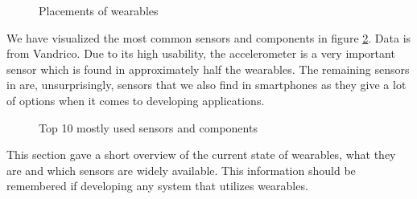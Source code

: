 \begin{figure}[!htb]
    \centering
    
    \caption{Placements of wearables}
    \label{fig:wearables-placement}
\end{figure}

We have visualized the most common sensors and components in figure \ref{fig:wearables-sensors}. Data is from Vandrico.
Due to its high usability, the accelerometer is a very important sensor which is found in approximately half the wearables. 
The remaining sensors in  are, unsurprisingly, sensors that we also find in smartphones as they give a lot of options when it comes to developing applications. 
\begin{figure}[!htb]
    \centering
    
    \caption{Top 10 mostly used sensors and components}
    \label{fig:wearables-sensors}
\end{figure}

This section gave a short overview of the current state of wearables, what they are and which sensors are widely available. 
This information should be remembered if developing any system that utilizes wearables. 


